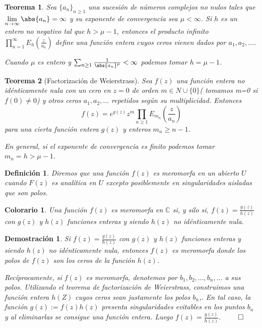 \documentclass[12pt]{book}
\newtheorem{defi}{Definición}[chapter]
\newtheorem{theorem}{Teorema}[chapter]
\newtheorem*{dem}{Demostración}
\newtheorem{col}{Colorario}[chapter]
\newcommand{\C}{\mathbb{C}}
\begin{document}
\begin{theorem}
Sea $\{a_n\}_{n\geq 1}$ una sucesión de números complejos no nulos tales que $\displaystyle\lim_{n\to \infty} \abs{a_n} = \infty$ y su exponente de convergencia sea $\mu < \infty$. Si $h$ es un entero no negativo tal que $h > \mu-1$, entonces el producto infinito $\displaystyle \prod_{n=1}^\infty E_h\left(\frac{z}{a_n}\right)$ define una función entera cuyos ceros vienen dados por $a_1,a_2,\ldots$.

Cuando $\mu$ es entero y $\sum_{n\geq 1}\frac{1}{\abs{a_n}^\mu} < \infty$ podemos tomar $h = \mu -1$.
\end{theorem}


\begin{theorem}[Factorización de Weierstrass]
Sea $f(z)$ una función entera no idénticamente nula con un cero en $z=0$ de orden $m\in N \cup \{0\}$( tomamos m=0 si $f(0) \neq 0$) y otros ceros $a_1,a_2,\ldots$ repetidos según su multiplicidad. Entonces 
$$f(z) = e^{g(z)}z^m \prod_{n\geq 1} E_{m_n}\left(\frac{z}{a_n}\right)$$
para una cierta función entera $g(z)$ y enteros $m_n \geq n-1$.

En general, si el exponente de convergencia es finito podemos tomar $m_n = h> \mu -1$.
\end{theorem}

\begin{defi}
Diremos que una función $f(z)$ es meromorfa en un abierto $U$ cuando $F(z)$ es analítica en $U$ excepto posiblemente en singularidades aisladas que son polos.
\end{defi}

\begin{col}
Una función $f(z)$ es meromorfa en $\C$ si, y silo si, $f(z) = \frac{g(z)}{h(z)}$ con $g(z)$ y $h(z)$ funciones enteras y siendo $h(z)$ no idénticamente nula.
\end{col}

\begin{dem}
Si $f(z) = \frac{g(z)}{h(z)}$ con $g(z)$ y $h(z)$ funciones enteras y siendo $h(z)$ no idénticamente nula, entonces $f(z)$ es meromorfa donde los polos de $f(z)$ son los ceros de la función $h(z)$.

Recíprocamente, si $f(z)$ es meromorfa, denotemos por $b_1,b_2,\ldots,b_n,\ldots$ a sus polos. Utilizando el teorema de factorización de Weierstrass, construimos una función entera $h(Z)$ cuyos ceros sean justamente los polos $b_n$,. En tal caso, la función $g(z):=f(z)h(z)$ presenta singularidades evitables en los puntos $b_n$ y al eliminarlas se consigue una función entera. Luego $f(z) = \frac{g(z)}{h(z)}$. $\qed$
\end{dem}
\end{document}
